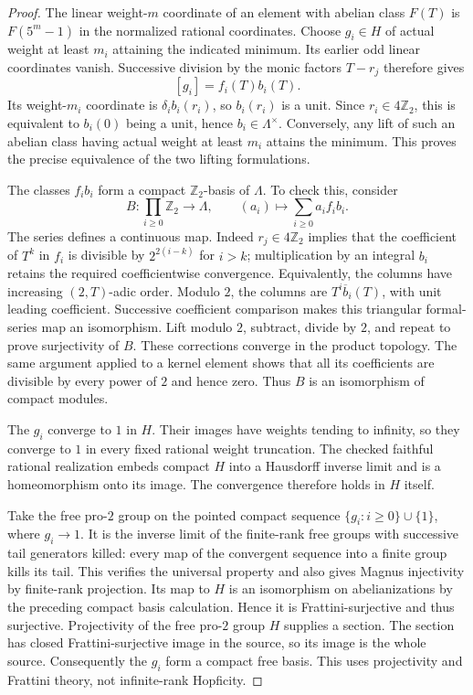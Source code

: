 \documentclass[11pt,a4paper]{article}
\theoremstyle{definition}
\begin{document}
\begin{proof}
The linear weight-$m$ coordinate of an element with abelian
class $F(T)$ is $F(5^m-1)$ in the normalized rational
coordinates. Choose $g_i\in H$ of actual weight at least
$m_i$ attaining the indicated minimum. Its earlier odd linear
coordinates vanish. Successive division by the monic factors
$T-r_j$ therefore gives
\[
 [g_i]=f_i(T)b_i(T).
\]
Its weight-$m_i$ coordinate is $\delta_i b_i(r_i)$, so
$b_i(r_i)$ is a unit. Since $r_i\in4\mathbb Z_2$, this is
equivalent to $b_i(0)$ being a unit, hence
$b_i\in\Lambda^\times$. Conversely, any lift of such an
abelian class having actual weight at least $m_i$ attains the
minimum. This proves the precise equivalence of the two
lifting formulations.

The classes $f_i b_i$ form a compact $\mathbb Z_2$-basis of
$\Lambda$. To check this, consider
\[
 B:\prod_{i\geq0}\mathbb Z_2\longrightarrow\Lambda,
       \qquad (a_i)\longmapsto\sum_{i\geq0}a_i f_i b_i.
\]
The series defines a continuous map. Indeed $r_j\in4\mathbb Z_2$
implies that the coefficient of $T^k$ in $f_i$ is divisible by
$2^{2(i-k)}$ for $i>k$; multiplication by an integral $b_i$
retains the required coefficientwise convergence. Equivalently,
the columns have increasing $(2,T)$-adic order. Modulo $2$,
the columns are $T^i\overline b_i(T)$, with unit leading
coefficient. Successive coefficient comparison makes this
triangular formal-series map an isomorphism. Lift modulo $2$,
subtract, divide by $2$, and repeat to prove surjectivity of
$B$. These corrections converge in the product topology.
The same argument applied to a kernel element shows that all
its coefficients are divisible by every power of $2$ and hence
zero. Thus $B$ is an isomorphism of compact modules.

The $g_i$ converge to $1$ in $H$. Their images have weights
tending to infinity, so they converge to $1$ in every fixed
rational weight truncation. The checked faithful rational
realization embeds compact $H$ into a Hausdorff inverse limit
and is a homeomorphism onto its image. The convergence therefore
holds in $H$ itself.

Take the free pro-$2$ group on the pointed compact sequence
$\{g_i:i\geq0\}\cup\{1\}$, where $g_i\to1$. It is the inverse
limit of the finite-rank free groups with successive tail
generators killed: every map of the convergent sequence into a
finite group kills its tail. This verifies the universal
property and also gives Magnus injectivity by finite-rank
projection. Its map to $H$
is an isomorphism on abelianizations by the preceding compact
basis calculation. Hence it is Frattini-surjective and thus
surjective. Projectivity of the free pro-$2$ group $H$ supplies
a section. The section has closed Frattini-surjective image in
the source, so its image is the whole source. Consequently the
$g_i$ form a compact free basis. This uses projectivity and
Frattini theory, not infinite-rank Hopficity.


\end{proof}
\end{document}
